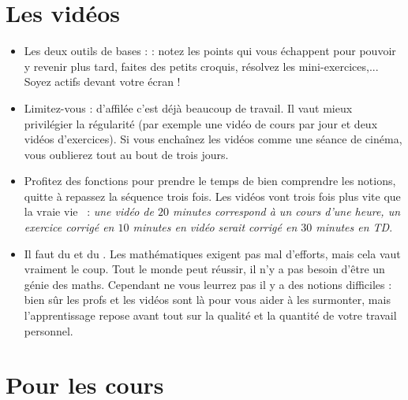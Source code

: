 











\section{Les vidéos}


\begin{itemize}
  \item Les deux outils de bases :  : notez les points 
qui vous échappent pour pouvoir y revenir plus tard, faites des petits croquis,
résolvez les mini-exercices,... Soyez actifs devant votre écran !

  \item Limitez-vous :  d'affilée c'est déjà beaucoup de travail.
Il vaut mieux privilégier la régularité (par exemple une vidéo de cours par jour et deux vidéos d'exercices).
Si vous enchaînez les vidéos comme une séance de cinéma, vous oublierez tout au bout de  trois jours.

  \item Profitez des fonctions  pour prendre le temps 
de bien comprendre les notions, quitte à repassez la séquence trois fois. Les vidéos vont trois fois plus vite que
la \og vraie vie \fg\ : \emph{une vidéo de $20$ minutes correspond à un cours d'une heure, un exercice corrigé en $10$ minutes
en vidéo serait corrigé en $30$ minutes en TD}.



  \item Il faut du  et du . Les mathématiques exigent pas mal d'efforts,
mais cela vaut vraiment le coup. Tout le monde peut réussir, il n'y a pas besoin d'être un génie des maths.
Cependant ne vous leurrez pas il y a des notions difficiles : bien sûr
les profs et les vidéos sont là pour vous aider à les surmonter, mais l'apprentissage repose
avant tout sur la qualité et la quantité de votre travail personnel.


\end{itemize}

\section{Pour les cours}

